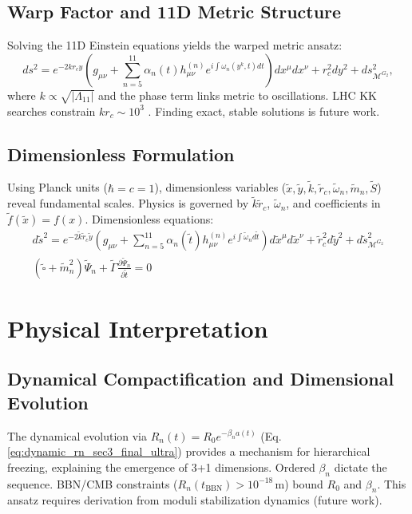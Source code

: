 \documentclass[12pt, a4paper]{article} %
\newcommand{\mGtwo}{\mathcal{M}^{G_2}}
\begin{document}
\subsection{Warp Factor and 11D Metric Structure}
Solving the 11D Einstein equations yields the warped metric ansatz:
\begin{equation}
ds^2 = e^{-2kr_c y} \left( g_{\mu\nu} + \sum_{n=5}^{11} \alpha_n(t) h_{\mu\nu}^{(n)} e^{i \int \omega_n(y^k, t) dt} \right) dx^\mu dx^\nu + r_c^2 dy^2 + ds^2_{\mGtwo},
\label{eq:metric_final_sec2_ultra}
\end{equation}
where \(k \propto \sqrt{|\Lambda_{11}|}\) and the phase term links metric to oscillations. LHC KK searches constrain \(kr_c \sim 10^3\) \cite{atlas2019search}. Finding exact, stable solutions is future work.

\subsection{Dimensionless Formulation}
Using Planck units (\(\hbar=c=1\)), dimensionless variables (\(\tilde{x}, \tilde{y}, \tilde{k}, \tilde{r}_c, \tilde{\omega}_n, \tilde{m}_n, \tilde{S}\)) reveal fundamental scales. Physics is governed by \(\tilde{k}\tilde{r}_c\), \(\tilde{\omega}_n\), and coefficients in \( \tilde{f}(\tilde{x}) = f(x) \). Dimensionless equations:
\begin{gather}
d\tilde{s}^2 = e^{-2\tilde{k}\tilde{r}_c \tilde{y}} \left( g_{\mu\nu} + \sum_{n=5}^{11} \alpha_n(\tilde{t}) h_{\mu\nu}^{(n)} e^{i \int \tilde{\omega}_n d\tilde{t}} \right) d\tilde{x}^\mu d\tilde{x}^\nu + \tilde{r}_c^2 d\tilde{y}^2 + d\tilde{s}^2_{\mGtwo} \label{eq:metric_dimless_sec2_final_full_ultra} \\
(\tilde{\square} + \tilde{m}_n^2) \tilde{\Psi}_n + \tilde{\Gamma} \frac{\partial \tilde{\Psi}_n}{\partial \tilde{t}} = 0 \label{eq:osc_dimless_sec2_final_full_ultra}
\end{gather}

\section{Physical Interpretation}
\label{sec:phys_interp}

\subsection{Dynamical Compactification and Dimensional Evolution}
The dynamical evolution via \(R_n(t) = R_0 e^{-\beta_n a(t)}\) (Eq. \ref{eq:dynamic_rn_sec3_final_ultra}) provides a mechanism for hierarchical freezing, explaining the emergence of 3+1 dimensions. Ordered \( \beta_n \) dictate the sequence. BBN/CMB constraints (\(R_n(t_{\text{BBN}}) > 10^{-18} \, \text{m}\)) bound \(R_0\) and \( \beta_n \). This ansatz requires derivation from moduli stabilization dynamics (future work).
\end{document}
